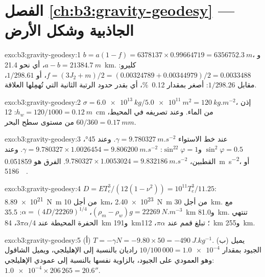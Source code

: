 \section*{الفصل \ref{ch:b3:gravity-geodesy} --- الجاذبية وشكل الأرض}

\begin{solution}{exo:b3:gravity-geodesy:1}
$b = a(1 - f) = 6378137\times0.99664719 = \qty{6356752.3}{m}$،
و$a - b = \qty{21384.7}{m}$، أي نحو \qty{21.4}{km}. كليرو:
$f = (3J_2 + m)/2 = (0.00324789 + 0.00344979)/2 = \num{0.0033488}$، أو
$1/298.61$، مقابل $1/298.26$: أصغر بمقدار \qty{0.12}{\percent}، أي بقدر
حدود الرتبة الثانية التي تُهمِلها العلاقة.
\end{solution}

\begin{solution}{exo:b3:gravity-geodesy:2}
$\sigma = \qty{6.0e13}{kg}/\qty{5.0e11}{m^2} = \qty{120}{kg.m^{-2}}$، إذن
$h_w = 120/1000 = \qty{0.12}{m}$: \qty{12}{cm} من الماء. وعند تصريفه في
المحيط، $60/360 = \qty{0.17}{mm}$ من مستوى سطح البحر.
\end{solution}

\begin{solution}{exo:b3:gravity-geodesy:3}
عند خط الاستواء $\gamma = \qty{9.780327}{m.s^{-2}}$. وعند \ang{45}،
$\sin^2\varphi = 0.5$ و$\sin^22\varphi = 1$: $\gamma = 9.780327\times1.0026454
= \qty{9.806200}{m.s^{-2}}$. وعند القطبين، $9.780327\times1.0053024 =
\qty{9.832186}{m.s^{-2}}$. الفرق هو \qty{0.051859}{m.s^{-2}}، أو
\qty{5186}{\milli\gal}.
\end{solution}

\begin{solution}{exo:b3:gravity-geodesy:4}
$D = ET_e^3/(12(1 - \nu^2)) = 10^{11}T_e^3/11.25$: \qty{8.89e21}{N.m} من أجل
\qty{10}{km}، \qty{2.40e23}{N.m} من أجل \qty{30}{km}. مع $(\rho_m - \rho_w)g =
\qty{22269}{N.m^{-3}}$، $\alpha = (4D/22269)^{1/4}$: \qty{35.5}{km}
و\qty{81.0}{km}. تنتهي الحفرة المحيطة عند $3\pi\alpha/4$، \qty{84}{km} و\qty{191}{km}؛
تبلغ قمم  عند $\pi\alpha$، \qty{112}{km} و\qty{255}{km}.
\end{solution}

\begin{solution}{exo:b3:gravity-geodesy:5}
(أ) $T = -\gamma N = -9.80\times50 = \qty{-490}{J.kg^{-1}}$. (ب) يميل الجيود
بمقدار $10/100\,000 = \num{1.0e-4}$ راديان بالنسبة إلى الإهليلجي، ويميل الشاقول
وهو العمودي على الجيود، بالزاوية نفسها بالنسبة إلى عمودي الإهليلجي:
$\num{1.0e-4}\times206\,265 = 20.6''$.
\end{solution}

